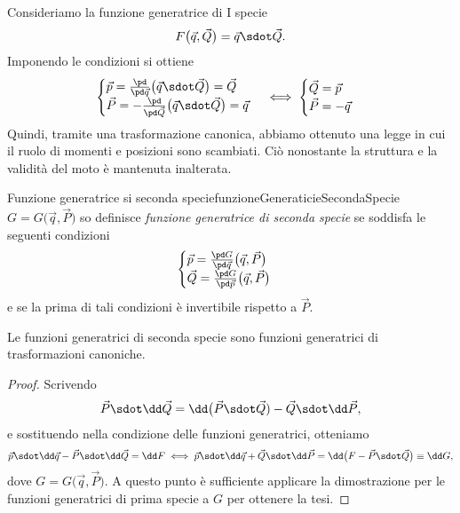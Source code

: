 \begin{ese}
	Consideriamo la funzione generatrice di I specie 
	\[
		F\big(\vec{q},\vec{Q}\big) = \vec{q} \sdot \vec{Q}.
	\]
	Imponendo le condizioni si ottiene
	\[
		\begin{cases}
			\vec{p} = \frac{\pd}{\pd\vec{q}} \big(\vec{q} \sdot \vec{Q}\big) = \vec{Q} \\
			\vec{P} = -\frac{\pd}{\pd\vec{Q}} \big(\vec{q} \sdot \vec{Q}\big) = \vec{q}
		\end{cases} \iff
		\begin{cases}
			\vec{Q} = \vec{p} \\
			\vec{P} = -\vec{q}
		\end{cases}
	\]
	Quindi, tramite una trasformazione canonica, abbiamo ottenuto una legge in cui il ruolo di momenti e posizioni sono scambiati. Ciò nonostante la struttura e la validità del moto è mantenuta inalterata.
\end{ese}

\begin{defn}{Funzione generatrice si seconda specie}{funzioneGeneraticieSecondaSpecie}
	\(G=G\big(\vec{q},\vec{P}\big)\) so definisce \emph{funzione generatrice di seconda specie} se soddisfa le seguenti condizioni
	\[
		\begin{cases}
			\vec{p} = \frac{\pd G}{\pd\vec{q}}\big(\vec{q},\vec{P}\big) \\
			\vec{Q} = \frac{\pd G}{\pd\vec{p}}\big(\vec{q},\vec{P}\big)
		\end{cases}
	\]
	e se la prima di tali condizioni è invertibile rispetto a \(\vec{P}\).
\end{defn}

\begin{pr}
	Le funzioni generatrici di seconda specie sono funzioni generatrici di trasformazioni canoniche.
\end{pr}

\begin{proof}
	Scrivendo
	\[
		\vec{P} \sdot \dd\vec{Q} = \dd\big(\vec{P}\sdot\vec{Q})-\vec{Q} \sdot \dd\vec{P},
	\]
	e sostituendo nella condizione delle funzioni generatrici, otteniamo
	\[
		\vec{p} \sdot \dd\vec{q} - \vec{P} \sdot \dd\vec{Q} = \dd F \iff \vec{p} \sdot \dd\vec{q} + \vec{Q} \sdot \dd\vec{P} = \dd\big(F-\vec{P} \sdot \vec{Q}\big) \equiv \dd G,
	\]
	dove \(G=G\big(\vec{q},\vec{P}\big)\).
	A questo punto è sufficiente applicare la dimostrazione per le funzioni generatrici di prima specie a \(G\) per ottenere la tesi.
\end{proof}

